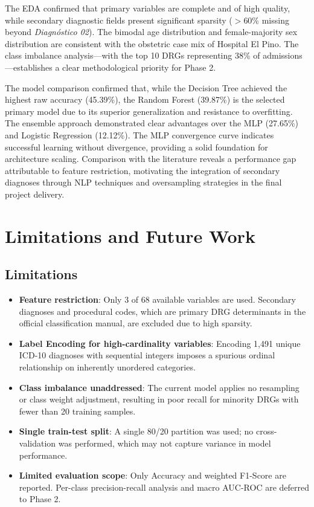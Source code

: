 \documentclass{IEEEtran}
\begin{document}
The EDA confirmed that primary variables are complete and of high quality, while secondary diagnostic fields present significant sparsity ($>$60\% missing beyond \textit{Diagn\'ostico 02}). The bimodal age distribution and female-majority sex distribution are consistent with the obstetric case mix of Hospital El Pino. The class imbalance analysis---with the top 10 DRGs representing 38\% of admissions---establishes a clear methodological priority for Phase 2.

The model comparison confirmed that, while the Decision Tree achieved the highest raw accuracy (45.39\%), the Random Forest (39.87\%) is the selected primary model due to its superior generalization and resistance to overfitting. The ensemble approach demonstrated clear advantages over the MLP (27.65\%) and Logistic Regression (12.12\%). The MLP convergence curve indicates successful learning without divergence, providing a solid foundation for architecture scaling. Comparison with the literature reveals a performance gap attributable to feature restriction, motivating the integration of secondary diagnoses through NLP techniques and oversampling strategies in the final project delivery.

\section{Limitations and Future Work}

\subsection{Limitations}
\begin{itemize}
    \item \textbf{Feature restriction}: Only 3 of 68 available variables are used. Secondary diagnoses and procedural codes, which are primary DRG determinants in the official classification manual, are excluded due to high sparsity.
    \item \textbf{Label Encoding for high-cardinality variables}: Encoding 1,491 unique ICD-10 diagnoses with sequential integers imposes a spurious ordinal relationship on inherently unordered categories.
    \item \textbf{Class imbalance unaddressed}: The current model applies no resampling or class weight adjustment, resulting in poor recall for minority DRGs with fewer than 20 training samples.
    \item \textbf{Single train-test split}: A single 80/20 partition was used; no cross-validation was performed, which may not capture variance in model performance.
    \item \textbf{Limited evaluation scope}: Only Accuracy and weighted F1-Score are reported. Per-class precision-recall analysis and macro AUC-ROC are deferred to Phase 2.
\end{itemize}
\end{document}
